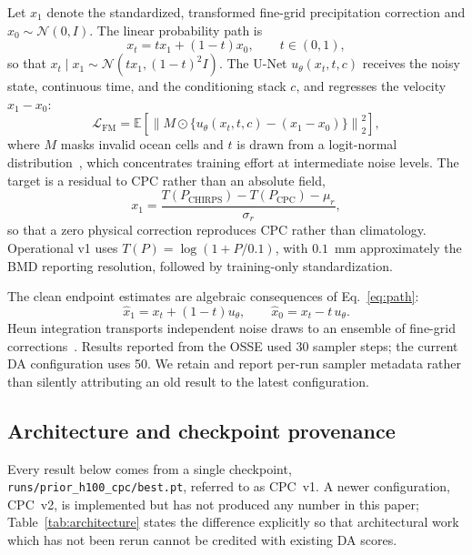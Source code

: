 \documentclass[10pt,twocolumn]{article}
\begin{document}
Let $x_1$ denote the standardized, transformed fine-grid precipitation
correction and $x_0\sim\mathcal{N}(0,I)$. The linear probability path is
\begin{equation}
 x_t = t x_1 + (1-t)x_0, \qquad t\in(0,1),
 \label{eq:path}
\end{equation}
so that $x_t\mid x_1 \sim \mathcal{N}\!\left(t x_1,(1-t)^2 I\right)$. The
U-Net $u_\theta(x_t,t,c)$ receives the noisy state, continuous time, and the
conditioning stack $c$, and regresses the velocity $x_1-x_0$:
\begin{equation}
 \mathcal{L}_{\mathrm{FM}}=
 \mathbb{E}\!\left[\left\|M\odot\{u_\theta(x_t,t,c)-(x_1-x_0)\}\right\|_2^2\right],
 \label{eq:flowloss}
\end{equation}
where $M$ masks invalid ocean cells and $t$ is drawn from a logit-normal
distribution~\cite{esser2024}, which concentrates training effort at
intermediate noise levels. The target is a residual to CPC rather than an
absolute field,
\begin{equation}
 x_1 = \frac{T(P_{\mathrm{CHIRPS}})-T(P_{\mathrm{CPC}})-\mu_r}{\sigma_r},
 \label{eq:residual}
\end{equation}
so that a zero physical correction reproduces CPC rather than climatology.
Operational v1 uses $T(P)=\log(1+P/0.1)$, with $0.1$~mm approximately the BMD
reporting resolution, followed by training-only standardization.

The clean endpoint estimates are algebraic consequences of
Eq.~\eqref{eq:path}:
\begin{equation}
 \widehat{x}_1=x_t+(1-t)u_\theta,\qquad
 \widehat{x}_0=x_t-t\,u_\theta .
 \label{eq:endpoints}
\end{equation}
Heun integration transports independent noise draws to an ensemble of
fine-grid corrections~\cite{karras2022}. Results reported from the OSSE used
30 sampler steps; the current DA configuration uses 50. We retain and report
per-run sampler metadata rather than silently attributing an old result to the
latest configuration.

\subsection{Architecture and checkpoint provenance}

Every result below comes from a single checkpoint,
\texttt{runs/prior\_h100\_cpc/best.pt}, referred to as CPC~v1. A newer
configuration, CPC~v2, is implemented but has not produced any number in this
paper; Table~\ref{tab:architecture} states the difference explicitly so that
architectural work which has not been rerun cannot be credited with existing
DA scores.
\end{document}
